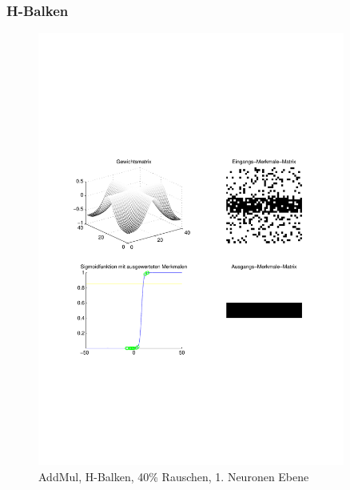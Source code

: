\subsubsection{H-Balken}
\begin{figure}[hbt]
	\centering
	\begin{minipage}[c]{\textwidth}
       	\includegraphics[trim=70 211 42 222, clip, width=0.9\textwidth]{./Bilder/Auswertung/Endergebnis/TypeAddMul_Rauschen40_H_Line_Layer1}
		\caption{AddMul, H-Balken, 40\% Rauschen, 1. Neuronen Ebene}
		\label{AddMul_H_40_1}

\end{minipage}
\end{figure}

